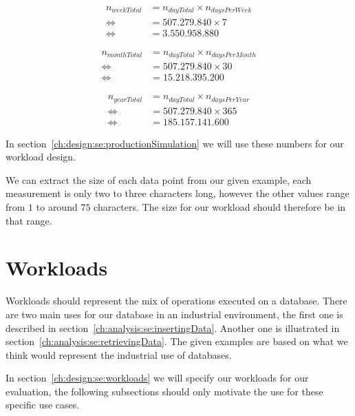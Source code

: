 \begin{equation}
  \label{eq:dataAmountWeek}
  \begin{aligned}
      n_{weekTotal} &= n_{dayTotal} \times n_{daysPerWeek} \\
      \iff &= 507.279.840 \times 7 \\
      \iff &= 3.550.958.880
  \end{aligned}
\end{equation}

\begin{equation}
  \label{eq:dataAmountMonth}
  \begin{aligned}
      n_{monthTotal} &= n_{dayTotal} \times n_{daysPerMonth} \\
      \iff &= 507.279.840 \times 30 \\
      \iff &= 15.218.395.200
  \end{aligned}
\end{equation}

\begin{equation}
  \label{eq:dataAmountYear}
  \begin{aligned}
      n_{yearTotal} &= n_{dayTotal} \times n_{daysPerYear} \\
      \iff &= 507.279.840 \times 365 \\
      \iff &= 185.157.141.600
  \end{aligned}
\end{equation}

In section~\ref{ch:design:se:productionSimulation} we will use these numbers for our workload design.

We can extract the size of each data point from our given example,
each measurement is only two to three characters long,
however the other values range from $ 1 $ to around $ 75 $ characters.
The size for our workload should therefore be in that range.

\section{Workloads}
\label{ch:analysis:se:workloads}
Workloads should represent the mix of operations executed on a database.
There are two main uses for our database in an industrial environment,
the first one is described in section~\ref{ch:analysis:se:insertingData}.
Another one is illustrated in section~\ref{ch:analysis:se:retrievingData}.
The given examples are based on what we think would represent the industrial use of databases.

In section~\ref{ch:design:se:workloads} we will specify our workloads for our evaluation,
the following subsections should only motivate the use for these specific use cases.

